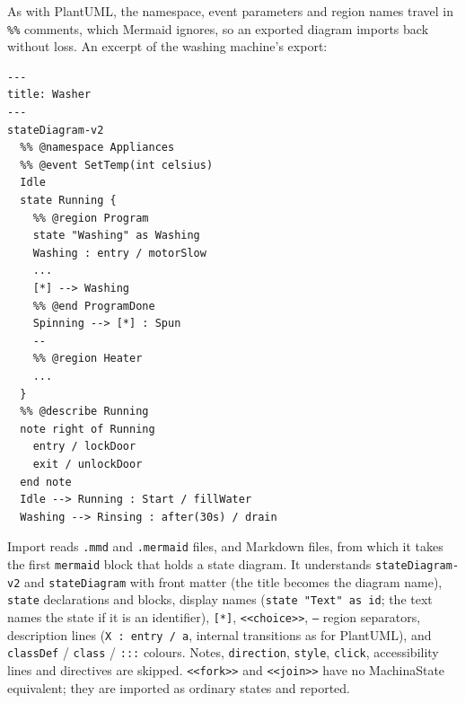 \documentclass[11pt,a4paper,openany]{report}
\newcommand{\code}[1]{\texttt{#1}}
\begin{document}
As with PlantUML, the namespace, event parameters and region names travel in \code{\%\%} comments,
which Mermaid ignores, so an exported diagram imports back without loss. An excerpt of the washing
machine's export:
\begin{lstlisting}
---
title: Washer
---
stateDiagram-v2
  %% @namespace Appliances
  %% @event SetTemp(int celsius)
  Idle
  state Running {
    %% @region Program
    state "Washing" as Washing
    Washing : entry / motorSlow
    ...
    [*] --> Washing
    %% @end ProgramDone
    Spinning --> [*] : Spun
    --
    %% @region Heater
    ...
  }
  %% @describe Running
  note right of Running
    entry / lockDoor
    exit / unlockDoor
  end note
  Idle --> Running : Start / fillWater
  Washing --> Rinsing : after(30s) / drain
\end{lstlisting}
Import reads \code{.mmd} and \code{.mermaid} files, and Markdown files, from which it takes the first
\code{\textasciigrave\textasciigrave\textasciigrave mermaid} block that holds a state diagram. It understands \code{stateDiagram-v2} and
\code{stateDiagram} with front matter (the title becomes the diagram name), \code{state} declarations
and blocks, display names (\code{state "Text" as id}; the text names the state if it is an identifier),
\code{[*]}, \code{<<choice>>}, \code{--} region separators, description lines (\code{X : entry / a},
internal transitions as for PlantUML), and \code{classDef} / \code{class} / \code{:::} colours. Notes,
\code{direction}, \code{style}, \code{click}, accessibility lines and directives are skipped.
\code{<<fork>>} and \code{<<join>>} have no MachinaState equivalent; they are imported as ordinary states
and reported.
\end{document}
